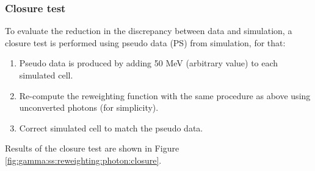 \begin{figure}[htbp]
\end{figure}

\subsubsection{Closure test}
To evaluate the reduction in the discrepancy between data and simulation, a closure test is performed using pseudo data (PS) from simulation, for that:
\begin{enumerate}
    \item Pseudo data is produced by adding 50 MeV (arbitrary value) to each simulated cell.
    \item Re-compute the reweighting function with the same procedure as above using unconverted photons (for simplicity).
    \item Correct simulated cell to match the pseudo data.
\end{enumerate}
Results of the closure test are shown in Figure \ref{fig:gamma:ss:reweighting:photon:closure}. 
